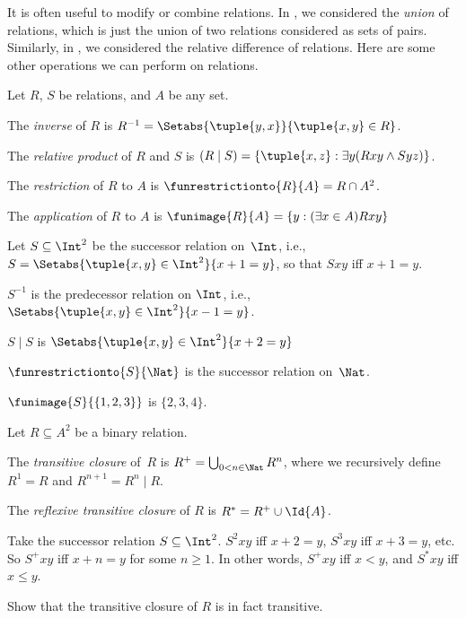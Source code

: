 \documentclass[../../../include/open-logic-section]{subfiles}
\begin{document}

It is often useful to modify or combine relations. In
, we considered the \emph{union}
of relations, which is just the union of two relations considered as
sets of pairs. Similarly, in ,
we considered the relative difference of relations. Here are some
other operations we can perform on relations.

\begin{defn} 
Let $R$, $S$ be relations, and $A$ be any set. 

The \emph{inverse} of $R$ is $R^{-1} = \Setabs{\tuple{y, x}}{\tuple{x,
    y} \in R}$.

The \emph{relative product} of $R$ and $S$ is $(R \mid S) =
\{\tuple{x, z} : \exists y(Rxy \land Syz)\}$.

The \emph{restriction} of $R$ to $A$ is $\funrestrictionto{R}{A}= R
\cap A^2$.

The \emph{application} of $R$ to $A$ is $\funimage{R}{A} = \{y :
(\exists x \in A)Rxy\}$
\end{defn}

\begin{ex}
Let $S \subseteq \Int^2$ be the successor relation on~$\Int$, i.e.,
$S = \Setabs{\tuple{x, y} \in \Int^2}{x + 1 = y}$, so that $Sxy$ iff $x + 1 = y$.

$S^{-1}$ is the predecessor relation on $\Int$, i.e.,
$\Setabs{\tuple{x,y}\in\Int^2}{x -1 =y}$.

$S\mid S$ is 
$ \Setabs{\tuple{x,y}\in\Int^2}{x + 2 =y}$

$\funrestrictionto{S}{\Nat}$ is the successor relation on~$\Nat$.

$\funimage{S}{\{1,2,3\}}$ is $\{2, 3, 4\}$.
\end{ex}

\begin{defn}Let $R \subseteq A^2$ be a binary relation. 
	
The \emph{transitive closure} of~$R$ is $R^+ = \bigcup_{0 < n \in
\Nat} R^n$, where we recursively define $R^1 = R$ and $R^{n+1} = R^n
\mid R$.

The \emph{reflexive transitive closure} of $R$ is $R^* = R^+ \cup
\Id{A}$.
\end{defn}

\begin{ex}
Take the successor relation $S \subseteq \Int^2$. $S^2xy$ iff $x + 2 =
y$, $S^3xy$ iff $x + 3 = y$, etc. So $S^+xy$ iff $x + n = y$ for some
$n \geq 1$. In other words, $S^+xy$ iff $x < y$, and $S^*xy$ iff $x \le
y$.
\end{ex}

\begin{prob}
Show that the transitive closure of $R$ is in fact transitive.
\end{prob}
\end{document}
